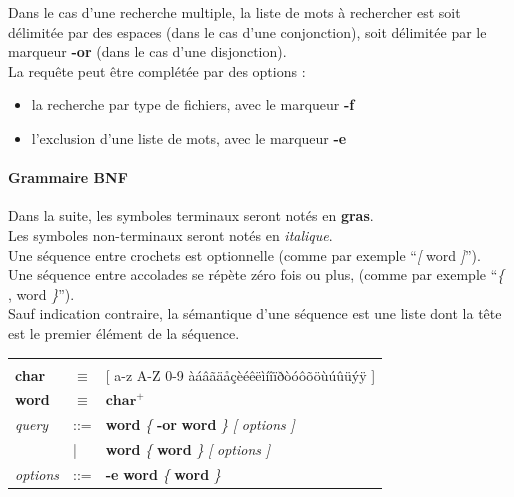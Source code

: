 \documentclass[a4paper,10pt]{article}
\begin{document}
Dans le cas d'une recherche multiple, la liste de mots à rechercher est soit délimitée par 
des espaces (dans le cas d'une conjonction), soit délimitée par le marqueur \textbf{-or} (dans le
cas d'une disjonction).\\

La requête peut être complétée par des options :
\begin{itemize}
 \item la recherche par type de fichiers, avec le marqueur \textbf{-f}
 \item l'exclusion d'une liste de mots, avec le marqueur \textbf{-e}
 \end{itemize}

\paragraph{Grammaire BNF\\}
Dans la suite, les symboles terminaux seront notés en \textbf{gras}.\\
Les symboles non-terminaux seront notés en \textit{italique}.\\
Une séquence entre crochets est optionnelle (comme par exemple ``\textit{[} word \textit{]}'').\\
Une séquence entre accolades se répète zéro fois ou plus, (comme par exemple ``\textit{\{} , word \textit{\}}'').\\
Sauf indication contraire, la sémantique d’une séquence est une liste dont la tête est le premier élément de la séquence.\\

\begin{tabular}{p{1.5cm} p{0.5cm} p{9cm} }
& & \\
\textbf{char} & $\equiv$ & [ a-z A-Z 0-9 àáâãäåçèéêëìíîïðòóôõöùúûüýÿ ]\\
\textbf{word} & $\equiv$ & $\textbf{char}^+$\\
\textit{query} & ::= & \textbf{word} \textit{\{} \textbf{-or} \textbf{word} \textit{\}} \textit{[} \textit{options} \textit{]}\\
& | & \textbf{word} \textit{\{} \textbf{word} \textit{\}} \textit{[} \textit{options} \textit{]}\\
\textit{options} & ::= & \textbf{-e} \textbf{word} \textit{\{} \textbf{word} \textit{\}}\\
\end{tabular}



\end{document}

